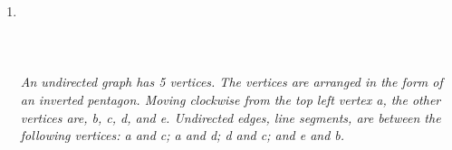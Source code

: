 \documentclass{amsart}
\theoremstyle{definition}
\theoremstyle{Exercise}
\theoremstyle{remark}
\theoremstyle{rule}
\numberwithin{equation}{section}
\begin{document}
\begin{enumerate}[label=(\alph*)]
\newpage
 \item
\hfil
  \\\\
\\
\\
   {\color{blue}{\bf Figure 3:} \emph{An undirected graph has 5 vertices. The vertices are arranged in the form of an inverted pentagon. Moving clockwise from the top left vertex a, the other vertices are, b, c, d, and e. Undirected edges, line segments, are between the following vertices: a and c; a and d; d and c; and e and b. 
  \\\\
}
}


 \newpage

 \


\end{enumerate}
\end{document}
